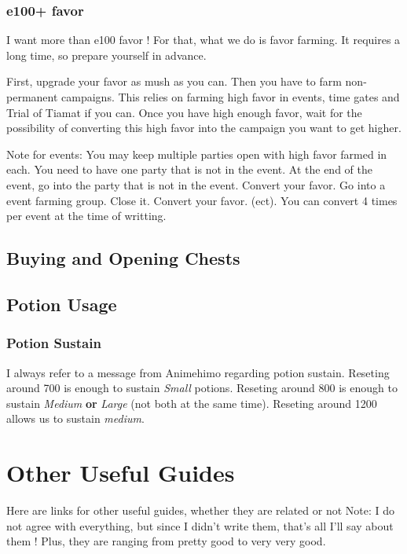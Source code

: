 \documentclass{article}
\begin{document}
\subsubsection{e100+ favor}

I want more than e100 favor !
For that, what we do is favor farming.
It requires a long time, so prepare yourself in advance.

First, upgrade your favor as mush as you can.
Then you have to farm non-permanent campaigns.
This relies on farming high favor in events, time gates and Trial of Tiamat if you can.
Once you have high enough favor, wait for the possibility of converting this high favor into the campaign you want to get higher.

Note for events:
You may keep multiple parties open with high favor farmed in each.
You need to have one party that is not in the event.
At the end of the event, go into the party that is not in the event.
Convert your favor.
Go into a event farming group.
Close it.
Convert your favor.
(ect).
You can convert 4 times per event at the time of writting.





\subsection{Buying and Opening Chests}
\subsection{Potion Usage}

\subsubsection{Potion Sustain}
\label{sec:potionSustain}

I always refer to a message from Animehimo regarding potion sustain.
Reseting around 700 is enough to sustain \textit{Small} potions.
Reseting around 800 is enough to sustain \textit{Medium} \textbf{or} \textit{Large} (not both at the same time).
Reseting around 1200 allows us to sustain \textit{medium}.


\section{Other Useful Guides}

Here are links for other useful guides, whether they are related or not
Note: I do not agree with everything, but since I didn't write them, that's all I'll say  about them !
Plus, they are ranging from pretty good to very very good.
\end{document}
